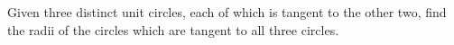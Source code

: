 Given three distinct unit circles, each of which is tangent to the other two, find the radii of the circles which are tangent to all three circles.